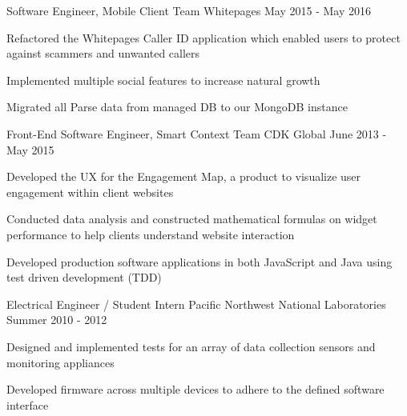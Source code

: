 \begin{cventries}
  \cventry
    {Software Engineer, Mobile Client Team} %
    {Whitepages} %
    {} %
    {May 2015 - May 2016} %
    {
	\begin{cvitems} %
    \item Refactored the Whitepages Caller ID application which enabled users to protect against scammers and unwanted callers
    \item Implemented multiple social features to increase natural growth
    \item Migrated all Parse data from managed DB to our MongoDB instance
	\end{cvitems}
    }

  \cventry
    {Front-End Software Engineer, Smart Context Team} %
    {CDK Global} %
    {} %
    {June 2013 - May 2015} %
    {
	\begin{cvitems} %
    \item Developed the UX for the Engagement Map, a product to visualize user engagement within client websites
    \item Conducted data analysis and constructed mathematical formulas on widget performance to help clients understand website interaction
    \item Developed production software applications in both JavaScript and Java using test driven development (TDD)
	\end{cvitems}
    }
    
  \cventry
    {Electrical Engineer / Student Intern} %
    {Pacific Northwest National Laboratories} %
    {} %
    {Summer 2010 - 2012} %
    {
	\begin{cvitems} %
    \item Designed and implemented tests for an array of data collection sensors and monitoring appliances
    \item Developed firmware across multiple devices to adhere to the defined software interface
	\end{cvitems}
    }


\end{cventries}
